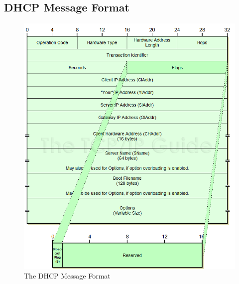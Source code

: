 \documentclass[11pt]{article}
\begin{document}
\subsection{DHCP Message Format}
\begin{figure}[H]
	\centering
	\includegraphics[scale = 0.8]{dhcpformat.png}
	\caption{The DHCP Message Format}
\end{figure}
\end{document}
